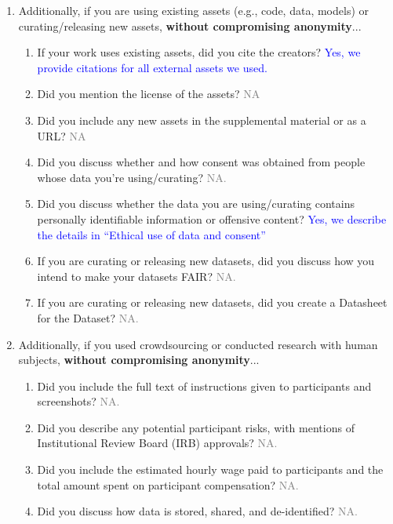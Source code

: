 \documentclass[letterpaper]{article} %
\newcommand{\answerYes}[1]{\textcolor{blue}{#1}}
\newcommand{\answerNA}[1]{\textcolor{gray}{#1}}
\begin{document}
\begin{enumerate}
\begin{enumerate}
\end{enumerate}

\item Additionally, if you are using existing assets (e.g., code, data, models) or curating/releasing new assets, \textbf{without compromising anonymity}...
\begin{enumerate}
  \item If your work uses existing assets, did you cite the creators?
    \answerYes{Yes, we provide citations for all external assets we used.}
  \item Did you mention the license of the assets?
    \answerNA{NA}
  \item Did you include any new assets in the supplemental material or as a URL?
    \answerNA{NA}
  \item Did you discuss whether and how consent was obtained from people whose data you're using/curating?
    \answerNA{NA.}
  \item Did you discuss whether the data you are using/curating contains personally identifiable information or offensive content?
\answerYes{Yes, we describe the details in ``Ethical use of data and consent''}
\item If you are curating or releasing new datasets, did you discuss how you intend to make your datasets FAIR?
\answerNA{NA.}
\item If you are curating or releasing new datasets, did you create a Datasheet for the Dataset? 
\answerNA{NA.}
\end{enumerate}

\item Additionally, if you used crowdsourcing or conducted research with human subjects, \textbf{without compromising anonymity}...
\begin{enumerate}
  \item Did you include the full text of instructions given to participants and screenshots?
    \answerNA{NA.}
  \item Did you describe any potential participant risks, with mentions of Institutional Review Board (IRB) approvals?
    \answerNA{NA.}
  \item Did you include the estimated hourly wage paid to participants and the total amount spent on participant compensation?
    \answerNA{NA.}
   \item Did you discuss how data is stored, shared, and de-identified?
   \answerNA{NA.}
\end{enumerate}

\end{enumerate}
\end{document}
